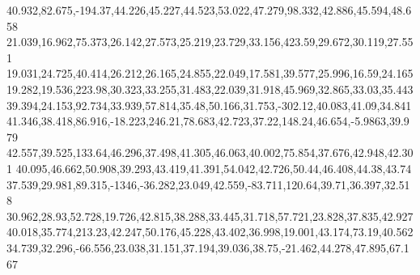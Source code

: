 40.932,82.675,-194.37,44.226,45.227,44.523,53.022,47.279,98.332,42.886,45.594,48.658
21.039,16.962,75.373,26.142,27.573,25.219,23.729,33.156,423.59,29.672,30.119,27.551
19.031,24.725,40.414,26.212,26.165,24.855,22.049,17.581,39.577,25.996,16.59,24.165
19.282,19.536,223.98,30.323,33.255,31.483,22.039,31.918,45.969,32.865,33.03,35.443
39.394,24.153,92.734,33.939,57.814,35.48,50.166,31.753,-302.12,40.083,41.09,34.841
41.346,38.418,86.916,-18.223,246.21,78.683,42.723,37.22,148.24,46.654,-5.9863,39.979
42.557,39.525,133.64,46.296,37.498,41.305,46.063,40.002,75.854,37.676,42.948,42.301
40.095,46.662,50.908,39.293,43.419,41.391,54.042,42.726,50.44,46.408,44.38,43.74
37.539,29.981,89.315,-1346,-36.282,23.049,42.559,-83.711,120.64,39.71,36.397,32.518
30.962,28.93,52.728,19.726,42.815,38.288,33.445,31.718,57.721,23.828,37.835,42.927
40.018,35.774,213.23,42.247,50.176,45.228,43.402,36.998,19.001,43.174,73.19,40.562
34.739,32.296,-66.556,23.038,31.151,37.194,39.036,38.75,-21.462,44.278,47.895,67.167
